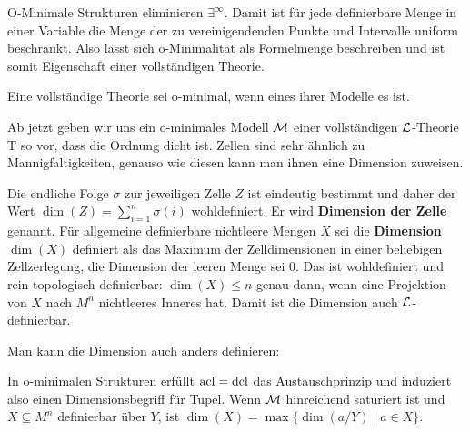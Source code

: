 \begin{corollary}
	O-Minimale Strukturen eliminieren $\exists^\infty$. Damit ist für jede definierbare Menge in einer Variable die Menge der zu vereinigendenden Punkte und Intervalle uniform beschränkt. Also lässt sich o-Minimalität als Formelmenge beschreiben und ist somit Eigenschaft einer vollständigen Theorie.
\end{corollary}

\begin{definition}
	Eine vollständige Theorie sei o-minimal, wenn eines ihrer Modelle es ist.
\end{definition}

Ab jetzt geben wir uns ein o-minimales Modell $\mathcal{M}$ einer vollständigen $\mathcal{L}$-Theorie T so vor, dass die Ordnung dicht ist. Zellen sind sehr ähnlich zu Mannigfaltigkeiten, genauso wie diesen kann man ihnen eine Dimension zuweisen.
\begin{lemdef}
	Die endliche Folge $\sigma$ zur jeweiligen Zelle $Z$ ist eindeutig bestimmt und daher der Wert $\dim(Z)=\sum\limits_{i=1}^n\sigma(i)$ wohldefiniert. Er wird \textbf{Dimension der Zelle} genannt. Für allgemeine definierbare nichtleere Mengen $X$ sei die \textbf{Dimension} $\dim(X)$ definiert als das Maximum der Zelldimensionen in einer beliebigen Zellzerlegung, die Dimension der leeren Menge sei 0. Das ist wohldefiniert und rein topologisch definierbar: $\dim(X)\leq n$ genau dann, wenn eine Projektion von $X$ nach $M^n$ nichtleeres Inneres hat. Damit ist die Dimension auch $\mathcal{L}$-definierbar.
\end{lemdef}

Man kann die Dimension auch anders definieren:
\begin{lemma}
	In o-minimalen Strukturen erfüllt $\operatorname{acl}=\operatorname{dcl}$ das Austauschprinzip und induziert also einen Dimensionsbegriff für Tupel. Wenn $\mathcal{M}$ hinreichend saturiert ist und $X\subseteq M^n$ definierbar über $Y$, ist $\dim(X)=\max\{\dim(a/Y)\mid a\in X\}$.
\end{lemma}

